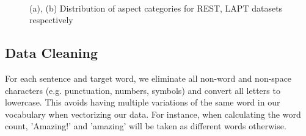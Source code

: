 \documentclass[comsoc,conference]{IEEEtran}
\begin{document}
\begin{figure}[!hb]
    \centering
    \hfill
    \\
    \hfill
  \caption{(a), (b) Distribution of aspect categories for REST, LAPT datasets respectively}
  \label{P2} 
\end{figure}

\subsection{Data Cleaning}

For each sentence and target word, we eliminate all non-word and non-space characters (e.g. punctuation, numbers, symbols) and convert all letters to lowercase. This avoids having multiple variations of the same word in our vocabulary when vectorizing our data. For instance, when calculating the word count, 'Amazing!' and 'amazing' will be taken as different words otherwise.
\end{document}
